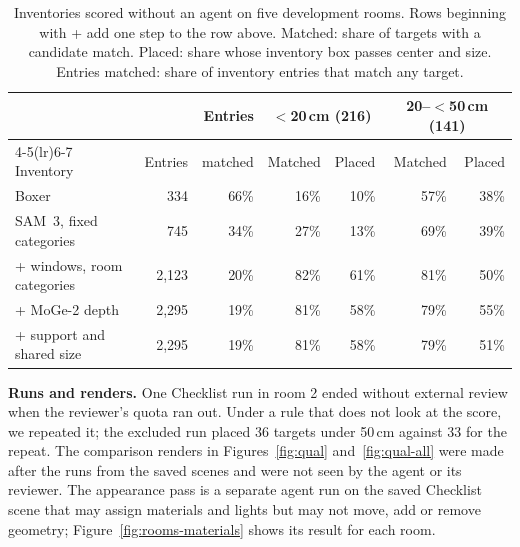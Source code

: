 \begin{table}[!htbp]
\centering\small
\caption{Inventories scored without an agent on five development rooms.
Rows beginning with + add one step to the row above. Matched: share of
targets with a candidate match. Placed: share whose inventory box passes
center and size. Entries matched: share of inventory entries that match any
target.}
\label{tab:inventory}
\begin{tabular}{lrrrrrr}
\toprule
& & Entries & \multicolumn{2}{c}{$<$20\,cm (216)} & \multicolumn{2}{c}{20--$<$50\,cm (141)} \\
\cmidrule(lr){4-5}\cmidrule(lr){6-7}
Inventory & Entries & matched & Matched & Placed & Matched & Placed \\
\midrule
Boxer & 334 & 66\% & 16\% & 10\% & 57\% & 38\% \\
SAM~3, fixed categories & 745 & 34\% & 27\% & 13\% & 69\% & 39\% \\
+ windows, room categories & 2{,}123 & 20\% & 82\% & 61\% & 81\% & 50\% \\
+ MoGe-2 depth & 2{,}295 & 19\% & 81\% & 58\% & 79\% & 55\% \\
+ support and shared size & 2{,}295 & 19\% & 81\% & 58\% & 79\% & 51\% \\
\bottomrule
\end{tabular}
\end{table}

\textbf{Runs and renders.} One Checklist run in room 2 ended without
external review when the reviewer's quota ran out. Under a rule that does not
look at the score, we repeated it; the excluded run placed 36 targets under
50\,cm against 33 for the repeat. The comparison
renders in Figures~\ref{fig:qual} and~\ref{fig:qual-all} were made after the
runs from the saved scenes and were not seen by the agent or its reviewer.
The appearance pass is a separate agent run on the saved Checklist scene
that may assign materials and lights but may not move, add or remove
geometry; Figure~\ref{fig:rooms-materials} shows its result for each room.

